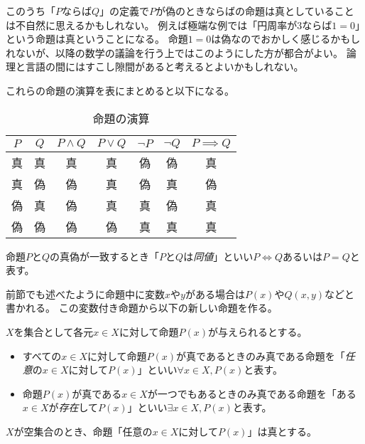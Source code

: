 このうち「$P$ならば$Q$」の定義で$P$が偽のときならばの命題は真としていることは不自然に思えるかもしれない。
例えば極端な例では「円周率が$3$ならば$1 = 0$」という命題は真ということになる。
命題$1 = 0$は偽なのでおかしく感じるかもしれないが、以降の数学の議論を行う上ではこのようにした方が都合がよい。
論理と言語の間にはすこし隙間があると考えるとよいかもしれない。

これらの命題の演算を表にまとめると以下になる。

\begin{table}[h]
\caption{命題の演算}
\centering
\begin{tabular}{ccccccc}
\hline
$P$ & $Q$ & $P \land Q$ & $P \lor Q$ & $\lnot P$ & $\lnot Q$ & $P \implies Q$ \\
\hline
真 & 真 & 真 & 真 & 偽 & 偽 & 真 \\
真 & 偽 & 偽 & 真 & 偽 & 真 & 偽 \\
偽 & 真 & 偽 & 真 & 真 & 偽 & 真 \\
偽 & 偽 & 偽 & 偽 & 真 & 真 & 真 \\
\hline
\end{tabular}
\end{table}

命題$P$と$Q$の真偽が一致するとき「$P$と$Q$は\emph{同値}」といい$P \iff Q$あるいは$P = Q$と表す。

前節でも述べたように命題中に変数$x$や$y$がある場合は$P(x)$や$Q(x, y)$などと書かれる。
この変数付き命題から以下の新しい命題を作る。

\begin{definition}[全称と存在]
$X$を集合として各元$x \in X$に対して命題$P(x)$が与えられるとする。
\begin{itemize}
\item
すべての$x \in X$に対して命題$P(x)$が真であるときのみ真である命題を「\emph{任意}の$x \in X$に対して$P(x)$」といい$\forall x \in X, P(x)$と表す。
\item
命題$P(x)$が真である$x \in X$が一つでもあるときのみ真である命題を「ある$x \in X$が\emph{存在}して$P(x)$」といい$\exists x \in X, P(x)$と表す。
\end{itemize}
\end{definition}

\begin{remark}
$X$が空集合のとき、命題「任意の$x \in X$に対して$P(x)$」は真とする。
\end{remark}

